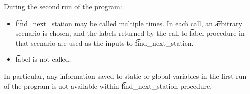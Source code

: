 During the second run of the program:
\begin{itemize}
\item \t{find\_next\_station} may be called multiple times. In each call, an \t{arbitrary} scenario is chosen, and the labels returned by the call to \t{label} procedure in that scenario are used as the inputs to \t{find\_next\_station}.
\item \t{label} is not called.
\end{itemize}

In particular, any information saved to static or global variables in the first run of the program is not available within \t{find\_next\_station} procedure.

